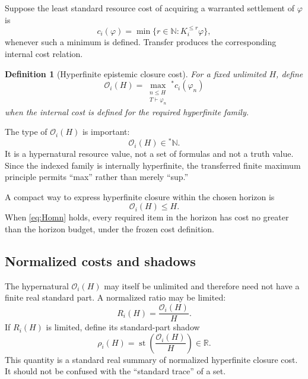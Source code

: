 \documentclass[11pt]{article}
\newtheorem{definition}{Definition}[section]
\newcommand{\st}{\operatorname{st}}
\newcommand{\Ocal}{\mathcal{O}}
\begin{document}
Suppose the least standard resource cost of acquiring a warranted settlement of $\varphi$ is
\begin{equation}
c_i(\varphi)=\min\{r\in\mathbb N:K_i^{\le r}\varphi\},
\end{equation}
whenever such a minimum is defined. Transfer produces the corresponding internal cost relation.

\begin{definition}[Hyperfinite epistemic closure cost]
For a fixed unlimited $H$, define
\begin{equation}
\boxed{
\Ocal_i(H)=
\max_{\substack{n\le H\\T\vdash\varphi_n}}
{}^*c_i(\varphi_n)
}
\label{eq:OH}
\end{equation}
when the internal cost is defined for the required hyperfinite family.
\end{definition}

The type of $\Ocal_i(H)$ is important:
\begin{equation}
\Ocal_i(H)\in{}^*\mathbb N.
\end{equation}
It is a hypernatural resource value, not a set of formulas and not a truth value. Since the indexed family is internally hyperfinite, the transferred finite maximum principle permits ``max'' rather than merely ``sup.''

A compact way to express hyperfinite closure within the chosen horizon is
\begin{equation}
\Ocal_i(H)\le H.
\label{eq:Homn}
\end{equation}
When \eqref{eq:Homn} holds, every required item in the horizon has cost no greater than the horizon budget, under the frozen cost definition.

\subsection{Normalized costs and shadows}

The hypernatural $\Ocal_i(H)$ may itself be unlimited and therefore need not have a finite real standard part. A normalized ratio may be limited:
\begin{equation}
R_i(H)=\frac{\Ocal_i(H)}{H}.
\end{equation}
If $R_i(H)$ is limited, define its standard-part shadow
\begin{equation}
\rho_i(H)=\st\!\left(\frac{\Ocal_i(H)}{H}\right)\in\mathbb R.
\label{eq:rho}
\end{equation}
This quantity is a standard real summary of normalized hyperfinite closure cost. It should not be confused with the ``standard trace'' of a set.
\end{document}
